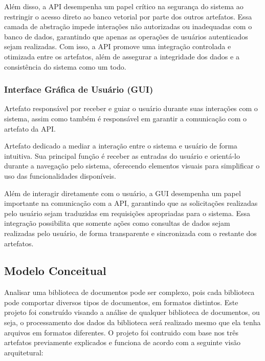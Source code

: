 \documentclass[a4paper, 12pt]{article}
\begin{document}
    Além disso, a API desempenha um papel crítico na segurança do sistema ao restringir o acesso direto ao banco vetorial por parte dos outros artefatos. Essa camada de abstração impede interações não autorizadas ou inadequadas com o banco de dados, garantindo que apenas as operações de usuários autenticados sejam realizadas. Com isso, a API promove uma integração controlada e otimizada entre os artefatos, além de assegurar a integridade dos dados e a consistência do sistema como um todo.
    
    \subsubsection{Interface Gráfica de Usuário (GUI)}
    Artefato responsável por receber e guiar o usuário durante suas interações com o sistema, assim como também é responsável em garantir a comunicação com o artefato da API.

    Artefato dedicado a mediar a interação entre o sistema e usuário de forma intuitiva. Sua principal função é receber as entradas do usuário e orientá-lo durante a navegação pelo sistema, oferecendo elementos visuais para simplificar o uso das funcionalidades disponíveis.

    Além de interagir diretamente com o usuário, a GUI desempenha um papel importante na comunicação com a API, garantindo que as solicitações realizadas pelo usuário sejam traduzidas em requisições apropriadas para o sistema. Essa integração possibilita que somente ações como consultas de dados sejam realizadas pelo usuário, de forma transparente e sincronizada com o restante dos artefatos.
    
    \subsection{Modelo Conceitual}
    
    Analisar uma biblioteca de documentos pode ser complexo, pois cada biblioteca pode comportar diversos tipos de documentos, em formatos distintos. Este projeto foi construído visando a análise de qualquer biblioteca de documentos, ou seja, o processamento dos dados da biblioteca será realizado mesmo que ela tenha arquivos em formatos diferentes. O projeto foi contruido com base nos três artefatos previamente explicados e funciona de acordo com a seguinte visão arquitetural:
\end{document}
